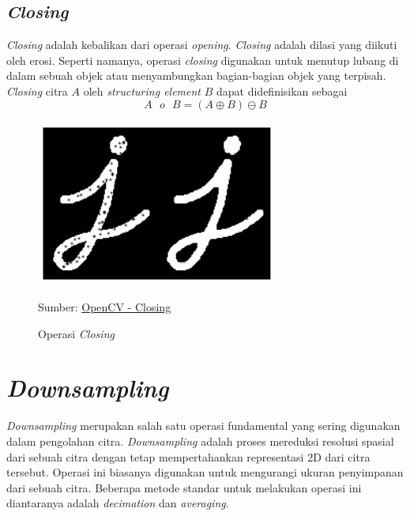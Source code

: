     \subsection{\textit{Closing}}
        \textit{Closing} adalah kebalikan dari operasi \textit{opening}. \textit{Closing} adalah dilasi yang diikuti oleh erosi. Seperti namanya, operasi \textit{closing} digunakan untuk menutup lubang di dalam sebuah objek atau menyambungkan bagian-bagian objek yang terpisah. \textit{Closing} citra $A$ oleh \textit{structuring element} $B$ dapat didefinisikan sebagai
        \begin{equation}\label{eq:2.16}
        A \text{ $o$ } B = (A \oplus B) \ominus B
        \end{equation}
        \begin{figure}[H]
        \centering
          \singlespacing
          \includegraphics[width=8cm]{image/closing.jpg}
          \caption{Operasi \textit{Closing}}
          \small{Sumber: \href{https://docs.opencv.org/3.4.15/d3/dbe/tutorial_opening_closing_hats.html}{OpenCV - Closing}}
          \label{fig:Closing}
        \end{figure}

\section{\textit{Downsampling}}
    \textit{Downsampling} merupakan salah satu operasi fundamental yang sering digunakan dalam pengolahan citra. \textit{Downsampling} adalah proses mereduksi resolusi spasial dari sebuah citra dengan tetap mempertahankan representasi 2D dari citra tersebut. Operasi ini biasanya digunakan untuk mengurangi ukuran penyimpanan dari sebuah citra. Beberapa metode standar untuk melakukan operasi ini diantaranya adalah \textit{decimation} dan \textit{averaging}.

